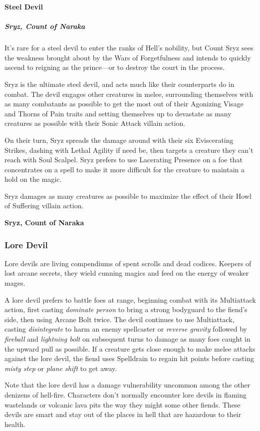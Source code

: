 \documentclass[10pt,a4paper,twoside,bg=print,twocolumn,openany,nodeprecatedcode]{dndbook}
\begin{document}
\textbf{Steel Devil}

\subparagraph{Sryz, Count of Naraka}
It's rare for a steel devil to enter the ranks of Hell's nobility, but Count Sryz sees the weakness brought about by the Wars of Forgetfulness and intends to quickly ascend to reigning as the prince—or to destroy the court in the process.

Sryz is the ultimate steel devil, and acts much like their counterparts do in combat. The devil engages other creatures in melee, surrounding themselves with as many combatants as possible to get the most out of their Agonizing Visage and Thorns of Pain traits and setting themselves up to devastate as many creatures as possible with their Sonic Attack villain action.

On their turn, Sryz spreads the damage around with their six Eviscerating Strikes, dashing with Lethal Agility if need be, then targets a creature they can't reach with Soul Scalpel. Sryz prefers to use Lacerating Presence on a foe that concentrates on a spell to make it more difficult for the creature to maintain a hold on the magic.

Sryz damages as many creatures as possible to maximize the effect of their Howl of Suffering villain action.

\textbf{Sryz, Count of Naraka}

\subsubsection{Lore Devil}
Lore devils are living compendiums of spent scrolls and dead codices. Keepers of lost arcane secrets, they wield cunning magics and feed on the energy of weaker mages.

A lore devil prefers to battle foes at range, beginning combat with its Multiattack action, first casting \textit{dominate person} to bring a strong bodyguard to the fiend's side, then using Arcane Bolt twice. The devil continues to use Multiattack, casting \textit{disintegrate} to harm an enemy spellcaster or \textit{reverse gravity} followed by \textit{fireball} and \textit{lightning bolt} on subsequent turns to damage as many foes caught in the upward pull as possible. If a creature gets close enough to make melee attacks against the lore devil, the fiend uses Spelldrain to regain hit points before casting \textit{misty step} or \textit{plane shift} to get away.

Note that the lore devil has a damage vulnerability uncommon among the other denizens of hell-fire. Characters don't normally encounter lore devils in flaming wastelands or volcanic lava pits the way they might some other fiends. These devils are smart and stay out of the places in hell that are hazardous to their health.
\end{document}
